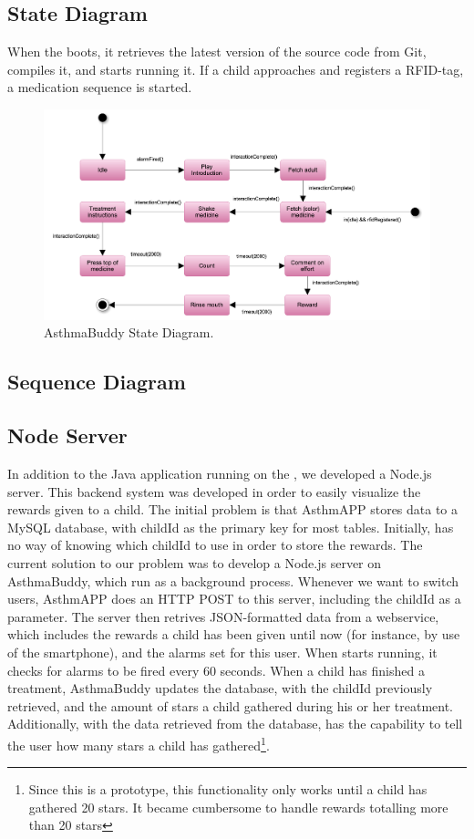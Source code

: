 \subsection{State Diagram}
When the \rpi{} boots, it retrieves the latest version of the source code from Git, compiles it, and starts running it. If a child approaches \buddy{} and registers a RFID-tag, a medication sequence is started.  

\begin{figure}[H] 
	\centering
		\includegraphics[width=0.6\paperwidth]{Pictures/statediagram.png}
	\caption{AsthmaBuddy State Diagram.}
	\label{fig:asthmabuddy_statediagram}
\end{figure}

\subsection{Sequence Diagram}


\subsection{Node Server}
In addition to the Java application running on the \rpi{}, we developed a Node.js server. This backend system was developed in order to easily visualize the rewards given to a child. The initial problem is that AsthmAPP stores data to a MySQL database, with childId as the primary key for most tables. Initially, \buddy{} has no way of knowing which childId to use in order to store the rewards. The current solution to our problem was to develop a Node.js server on AsthmaBuddy, which run as a background process. Whenever we want to switch users, AsthmAPP does an HTTP POST to this server, including the childId as a parameter. The server then retrives JSON-formatted data from a webservice, which includes the rewards a child has been given until now (for instance, by use of the smartphone), and the alarms set for this user. 
When \buddy{} starts running, it checks for alarms to be fired every 60 seconds. When a child has finished a treatment, AsthmaBuddy updates the database, with the childId previously retrieved, and the amount of stars a child gathered during his or her treatment. Additionally, with the data retrieved from the database, \buddy{} has the capability to tell the user how many stars a child has gathered\footnote{Since this is a prototype, this functionality only works until a child has gathered 20 stars. It became cumbersome to handle rewards totalling more than 20 stars}. 

